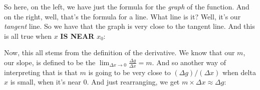 \documentclass[pdftex, brazil, 12pt, twoside]{article}
\begin{document}
\begin{figure}[H]
  \begin{center}
  \end{center}
\end{figure}

So here, on the left, we have just the formula
for the \emph{graph} of the function.
And on the right, well, that's the formula for a line.
What line is it?
Well, it's our \emph{tangent} line.
So we have that the graph is very close to the tangent line.
And this is all true when $x$ \textbf{IS NEAR} $x_0$:

\begin{figure}[H]
  \begin{center}
  \end{center}
\end{figure}

Now, this all stems from the definition of the derivative.
We know that our $m$, our slope, is
defined to be the $\displaystyle \lim_{\Delta x \to 0}{\frac{\Delta g}{\Delta x}} = m$.
And so another way of interpreting that
is that $m$ is going to be very close to $(\Delta g)/(\Delta x)$
when delta $x$ is small, when it's near 0.
And just rearranging, we get $m \times \Delta x \approx \Delta g$:
\end{document}
